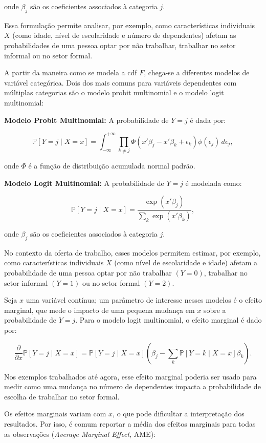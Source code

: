 \documentclass[12pt]{article}
\theoremstyle{break}
\begin{document}
onde \( \beta_j \) são os coeficientes associados à categoria \( j \).

Essa formulação permite analisar, por exemplo, como características individuais \( X \) (como idade, nível de escolaridade e número de dependentes) afetam as probabilidades de uma pessoa optar por não trabalhar, trabalhar no setor informal ou no setor formal.

A partir da maneira como se modela a cdf \( F \), chega-se a diferentes modelos de variável categórica. Dois dos mais comuns para variáveis dependentes com múltiplas categorias são o modelo probit multinomial e o modelo logit multinomial:

\textbf{Modelo Probit Multinomial:} A probabilidade de \( Y = j \) é dada por:

\[
\mathbb{P}[Y = j \mid X = x] = \int_{-\infty}^{+\infty} \prod_{k \neq j} \Phi(x'\beta_j - x'\beta_k + \epsilon_k) \phi(\epsilon_j) \, d\epsilon_j,
\]

onde \( \Phi \) é a função de distribuição acumulada normal padrão.

\textbf{Modelo Logit Multinomial:} A probabilidade de \( Y = j \) é modelada como:

\[
\mathbb{P}[Y = j \mid X = x] = \frac{\exp(x'\beta_j)}{\sum_{k} \exp(x'\beta_k)},
\]

onde \( \beta_j \) são os coeficientes associados à categoria \( j \).

No contexto da oferta de trabalho, esses modelos permitem estimar, por exemplo, como características individuais \( X \) (como nível de escolaridade e idade) afetam a probabilidade de uma pessoa optar por não trabalhar \( (Y = 0) \), trabalhar no setor informal \( (Y = 1) \) ou no setor formal \( (Y = 2) \).

Seja \( x \) uma variável contínua; um parâmetro de interesse nesses modelos é o efeito marginal, que mede o impacto de uma pequena mudança em \( x \) sobre a probabilidade de \( Y = j \). Para o modelo logit multinomial, o efeito marginal é dado por:

\[
\frac{\partial}{\partial x} \mathbb{P}[Y = j \mid X = x] = \mathbb{P}[Y = j \mid X = x] \left( \beta_j - \sum_{k} \mathbb{P}[Y = k \mid X = x] \beta_k \right).
\]

Nos exemplos trabalhados até agora, esse efeito marginal poderia ser usado para medir como uma mudança no número de dependentes impacta a probabilidade de escolha de trabalhar no setor formal.

Os efeitos marginais variam com \( x \), o que pode dificultar a interpretação dos resultados. Por isso, é comum reportar a média dos efeitos marginais para todas as observações (\textit{Average Marginal Effect}, AME):
\end{document}
